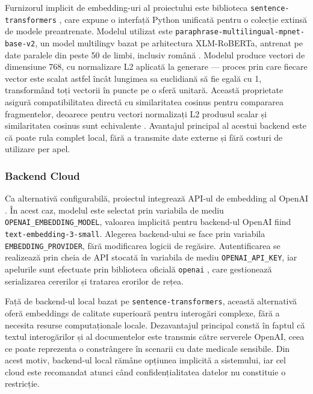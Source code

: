 \documentclass[12pt, a4paper, oneside, romanian]{teza-upb}
\begin{document}
Furnizorul implicit de 
embedding-uri al proiectului este biblioteca \texttt{sentence-transformers} 
\cite{sentence_transformers_doc}, care expune o interfață Python unificată pentru 
o colecție extinsă de modele preantrenate. Modelul utilizat este 
\texttt{paraphrase-multilingual-mpnet-base-v2}, un model multilingv bazat pe 
arhitectura XLM-RoBERTa, antrenat pe date paralele din peste 50 de limbi, 
inclusiv română \cite{paraphrase_multilingual_mpnet}. Modelul produce vectori de dimensiune 768, cu normalizare L2 aplicată la 
generare — proces prin care fiecare vector este scalat astfel încât lungimea 
sa euclidiană să fie egală cu 1, transformând toți vectorii în puncte pe o 
sferă unitară. Această proprietate asigură compatibilitatea directă cu 
similaritatea cosinus pentru compararea fragmentelor, deoarece pentru vectori 
normalizați L2 produsul scalar și similaritatea cosinus sunt echivalente 
\cite{paraphrase_multilingual_mpnet}. Avantajul principal al acestui backend 
este că poate rula complet local, fără a transmite date externe și fără costuri 
de utilizare per apel.

\subsubsection{Backend Cloud}

Ca alternativă configurabilă, proiectul integrează API-ul de embedding al OpenAI \cite{openai_embeddings}. În acest caz, modelul este selectat prin variabila de mediu \texttt{OPENAI\_EMBEDDING\_MODEL}, valoarea implicită pentru backend-ul OpenAI fiind \texttt{text-embedding-3-small}. Alegerea backend-ului se face prin variabila \texttt{EMBEDDING\_PROVIDER}, fără modificarea logicii de regăsire. Autentificarea se realizează prin cheia de API stocată în variabila de mediu \texttt{OPENAI\_API\_KEY}, iar apelurile sunt efectuate prin biblioteca oficială \texttt{openai} \cite{openai_api}, care gestionează serializarea cererilor și tratarea erorilor de rețea.

Față de backend-ul local bazat pe \texttt{sentence-transformers}, această 
alternativă oferă embeddings de calitate superioară pentru interogări complexe, 
fără a necesita resurse computaționale locale. Dezavantajul principal constă 
în faptul că textul interogărilor și al documentelor este transmis către 
serverele OpenAI, ceea ce poate reprezenta o constrângere în scenarii cu date 
medicale sensibile. Din acest motiv, backend-ul local rămâne opțiunea implicită 
a sistemului, iar cel cloud este recomandat atunci când confidențialitatea 
datelor nu constituie o restricție.
\end{document}

